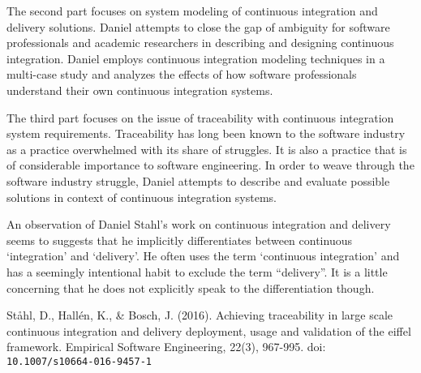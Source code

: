 \documentclass[11pt,a4paper]{article}
\begin{document}
\begin{thebibliography}{6}
\begin{adjustwidth}{1cm}{}
		The second part focuses on system modeling of continuous integration and delivery
		solutions. Daniel attempts to close the gap of ambiguity for software professionals and
		academic researchers in describing and designing continuous integration. Daniel
		employs continuous integration modeling techniques in a multi-case study and analyzes
		the effects of how software professionals understand their own continuous integration
		systems.
		
		The third part focuses on the issue of traceability with continuous integration system
		requirements. Traceability has long been known to the software industry as a practice
		overwhelmed with its share of struggles. It is also a practice that is of considerable
		importance to software engineering. In order to weave through the software industry
		struggle, Daniel attempts to describe and evaluate possible solutions in context of
		continuous integration systems.
		
		An observation of Daniel Stahl’s work on continuous integration and delivery seems to
		suggests that he implicitly differentiates between continuous ‘integration’ and
		‘delivery’. He often uses the term ‘continuous integration’ and has a seemingly
		intentional habit to exclude the term “delivery”. It is a little concerning that he does not
		explicitly speak to the differentiation though.
	\end{adjustwidth}
	
	 St\aa hl, D., Hall\'{e}n, K., \& Bosch, J. (2016). Achieving traceability in large scale continuous integration and delivery deployment, usage and validation of the eiffel framework. Empirical Software Engineering, 22(3), 967-995. doi:\\\texttt{10.1007/s10664-016-9457-1}
	
	
\end{thebibliography}
\end{document}

